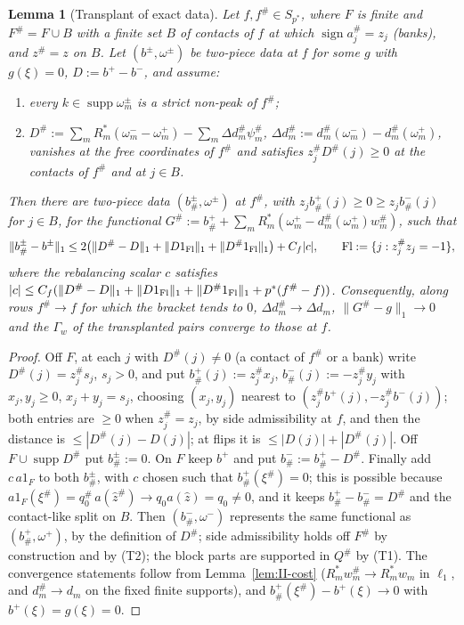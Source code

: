 \documentclass[10pt]{amsart}
\newtheorem{lemma}[theorem]{Lemma}
\theoremstyle{definition}
\theoremstyle{remark}
\newcommand{\supp}{\operatorname{supp}}
\newcommand{\sgn}{\operatorname{sign}}
\newcommand{\zh}{\hat z}
\begin{document}
\begin{lemma}[Transplant of exact data]\label{lem:II-transplant}
Let $f,f^\#\in S_{p^*}$, where $F$ is finite and $F^\#=F\cup B$ with a finite
set $B$ of contacts of $f$ at which $\sgn a^\#_j=z_j$ \textup{(}banks\textup{)},
and $z^\#=z$ on $B$.  Let $(b^\pm,\omega^\pm)$ be two-piece data at $f$ for some
$g$ with $g(\xi)=0$, $D:=b^+-b^-$, and assume:
\begin{enumerate}
\item[(T1)] every $k\in\supp\omega^\pm_m$ is a strict non-peak of $f^\#$;
\item[(T2)] $D^\#:=\sum_mR_m^*(\omega^-_m-\omega^+_m)-\sum_m\Delta d^\#_m\psi^\#_m$,
$\Delta d^\#_m:=d^\#_m(\omega^-_m)-d^\#_m(\omega^+_m)$, vanishes at the free
coordinates of $f^\#$ and satisfies $z^\#_jD^\#(j)\ge0$ at the contacts of
$f^\#$ and at $j\in B$.
\end{enumerate}
Then there are two-piece data $(b^\pm_\#,\omega^\pm)$ at $f^\#$, with
$z_jb^+_\#(j)\ge0\ge z_jb^-_\#(j)$ for $j\in B$, for the functional $G^\#:=b^+_\#+
\sum_mR_m^*(\omega^+_m-d^\#_m(\omega^+_m)w^\#_m)$, such that
\[
 \|b^\pm_\#-b^\pm\|_1\le2\big(\|D^\#-D\|_1+\|D1_{\rm Fl}\|_1+\|D^\#1_{\rm Fl}\|_1\big)
 +C_f|c|,\qquad{\rm Fl}:=\{j:z^\#_jz_j=-1\},
\]
where the rebalancing scalar $c$ satisfies $|c|\le C_f(\|D^\#-D\|_1+\|D1_{\rm
Fl}\|_1+\|D^\#1_{\rm Fl}\|_1+p^*(f^\#-f))$.  Consequently, along rows $f^\#\to f$
for which the bracket tends to $0$, $\Delta d^\#_m\to\Delta d_m$, $\|G^\#-g\|_1\to0$
and the $\Gamma_w$ of the transplanted pairs converge to those at $f$.
\end{lemma}

\begin{proof}
Off $F$, at each $j$ with $D^\#(j)\ne0$ (a contact of $f^\#$ or a bank) write
$D^\#(j)=z^\#_js_j$, $s_j>0$, and put $b^+_\#(j):=z^\#_jx_j$, $b^-_\#(j):=-z^\#_jy_j$
with $x_j,y_j\ge0$, $x_j+y_j=s_j$, choosing $(x_j,y_j)$ nearest to
$(z^\#_jb^+(j),-z^\#_jb^-(j))$; both entries are $\ge0$ when $z^\#_j=z_j$, by side
admissibility at $f$, and then the distance is $\le|D^\#(j)-D(j)|$; at flips it
is $\le|D(j)|+|D^\#(j)|$.  Off $F\cup\supp D^\#$ put $b^\pm_\#:=0$.  On $F$ keep
$b^+$ and put $b^-_\#:=b^+_\#-D^\#$.  Finally add $c\,a1_F$ to both $b^\pm_\#$, with
$c$ chosen such that $b^+_\#(\xi^\#)=0$; this is possible because $a1_F(\xi^\#)=
q^\#_0\,a(\zh^\#)\to q_0a(\zh)=q_0\ne0$, and it keeps $b^+_\#-b^-_\#=D^\#$ and the
contact-like split on $B$.  Then $(b^-_\#,\omega^-)$ represents the same functional
as $(b^+_\#,\omega^+)$, by the definition of $D^\#$; side admissibility holds off
$F^\#$ by construction and by (T2); the block parts are supported in $Q^\#$ by
(T1).  The convergence statements follow from Lemma~\ref{lem:II-cost}
($R_m^*w^\#_m\to R_m^*w_m$ in $\ell_1$, and $d^\#_m\to d_m$ on the fixed finite
supports), and $b^+_\#(\xi^\#)-b^+(\xi)\to0$ with $b^+(\xi)=g(\xi)=0$.
\end{proof}
\end{document}
